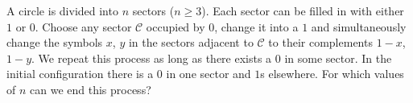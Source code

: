 \documentclass[varwidth]{standalone}
\begin{document}
    A circle is divided into $n$ sectors ($n \geq 3$). Each sector can be filled in with either $1$ or $0$. Choose any sector $\mathcal{C}$ occupied by $0$, change it into a $1$ and simultaneously change the symbols $x$, $y$ in the sectors adjacent to $\mathcal{C}$ to their complements $1 - x$, $1 - y$. We repeat this process as long as there exists a $0$ in some sector. In the initial configuration there is a $0$ in one sector and $1$s elsewhere. For which values of $n$ can we end this process?
\end{document}
